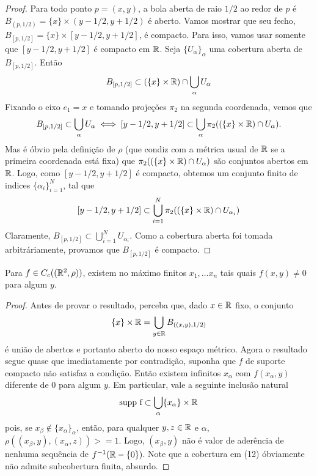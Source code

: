 \begin{proof}
    Para todo ponto $p = (x,y)$, a bola aberta de raio $1/2$ ao redor de $p$ é $B_{(p,1/2)} = \{x\} \times (y-1/2, y+1/2)$ é aberto. Vamos mostrar que
    seu fecho, $B_{[p,1/2]} = \{x\} \times [y-1/2, y+1/2]$, é compacto. Para isso, vamos usar somente que $[y-1/2,y+1/2]$ é compacto em $\mathbb{R}$.
    Seja $\{U_\alpha\}_\alpha$ uma cobertura aberta de $B_{[p,1/2]}$.
    Então
        $$B_{[p,1/2]} \subset (\{x\}\times \mathbb{R}) \cap \bigcup_\alpha U_\alpha$$
    Fixando o eixo $e_1 = x$ e tomando projeções $\pi_2$ na segunda coordenada, vemos que
    $$
        B_{[p,1/2]} \subset \bigcup_\alpha U_\alpha \iff [y-1/2,y+1/2] \subset \bigcup_\alpha \pi_2((\{x\} \times \mathbb{R}) \cap U_\alpha).
    $$
    Mas é óbvio pela definição de $\rho$ (que condiz com a métrica usual de $\mathbb{R}$ se a primeira coordenada está fixa) 
    que $\pi_2((\{x\} \times \mathbb{R}) \cap U_\alpha)$ são conjuntos abertos em $\mathbb{R}$. Logo, como $[y-1/2, y+1/2]$ é compacto,
    obtemos um conjunto finito de indices $\{\alpha_i\}_{i=1}^{N}$, tal que
    $$
    [y-1/2,y+1/2] \subset \bigcup_{i=1}^N \pi_2((\{x\} \times \mathbb{R}) \cap U_{\alpha_i})
    $$
    Claramente, $B_{[p,1/2]} \subset \bigcup_{i=1}^N U_{\alpha_i}$. Como a cobertura aberta foi 
    tomada arbitráriamente, provamos que $B_{[p,1/2]}$ é compacto.
\end{proof}

\begin{prop}
    \label{prob:l4:finite_compact}
    Para $f \in C_c((\mathbb{R}^2,\rho))$, existem no máximo finitos $x_1, \dots x_n$ tais quais $f(x,y) \neq 0$ para algum $y$. 
\end{prop}
\begin{proof}
    Antes de provar o resultado, perceba que, dado $x \in \mathbb{R}$ fixo, o conjunto 
    $$\{x\} \times \mathbb{R} = \bigcup_{y \in \mathbb{R}} B_{((x,y) , 1/2)}$$
    é união de abertos e portanto aberto do nosso espaço métrico.
    Agora o resultado segue quase que imediatamente por contradição, 
    suponha que $f$ de suporte compacto não satisfaz a condição. Então 
    existem infinitos $x_\alpha$ com $f(x_\alpha,y)$ diferente de $0$ para algum $y$.
    Em particular, vale a seguinte inclusão natural
    \begin{equation}
        \text{supp f} \subset \bigcup_\alpha \{x_\alpha\} \times \mathbb{R}
    \end{equation}
    pois, se $x_\beta \not \in \{x_\alpha\}_\alpha$, então, para qualquer $y,z \in \mathbb{R}$ e $\alpha$, $\rho( (x_\beta, y) , (x_\alpha, z)) >= 1$. 
    Logo, $(x_\beta, y)$ não é valor de aderência de nenhuma sequência de $f^{-1}(\mathbb{R} - \{0\})$. Note 
    que a cobertura em (12) óbviamente não admite subcobertura finita, absurdo.
\end{proof}

